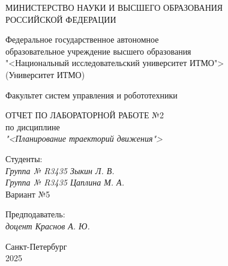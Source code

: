 \thispagestyle{empty}

\begin{center}
    МИНИСТЕРСТВО НАУКИ И ВЫСШЕГО ОБРАЗОВАНИЯ \\ РОССИЙСКОЙ ФЕДЕРАЦИИ

    \vspace{20pt}

    Федеральное государственное автономное \\ образовательное учреждение высшего образования \\
    "<Национальный исследовательский университет ИТМО"> \\
    (Университет ИТМО)

    \vspace{20pt}

    Факультет систем управления и робототехники
\end{center}

\vfill

\begin{center}
    ОТЧЕТ ПО ЛАБОРАТОРНОЙ РАБОТЕ №2\\  
    по дисциплине \\
    \textit{"<Планирование траекторий движения">}

    \vspace{20pt}

    
\end{center}

\vfill

    \noindent Студенты: \\
    \textit{Группа № R3435 \hfill Зыкин Л. В.} \\
    \textit{Группа № R3435 \hfill Цаплина М. А.} \\
    \noindent Вариант №5 \\

    \vspace{20pt}

    \noindent Предподаватель: \\
    \textit{доцент \hfill Краснов А. Ю.}

\vfill

\begin{center}
    Санкт-Петербург \\ 2025
\end{center}
